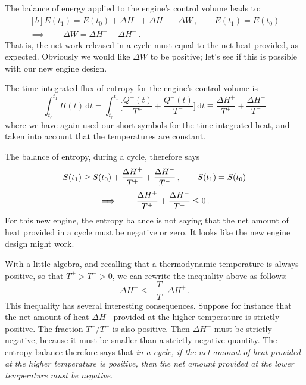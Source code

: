 \documentclass[a4paper,12pt,%
onecolumn,oneside,%
british%
]{memoir}
\newcommand*{\di}{\mathrm{d}}%
\newcommand*{\incr}{\Delta}%
\renewcommand*{\|}[1][]{\nonscript\:#1\vert\nonscript\:\mathopen{}}
\newcommand*{\yti}{t_{0}}
\newcommand*{\ytf}{t_{1}}
\newcommand*{\dt}{\di t}
\newcommand*{\yE}{E}
\newcommand*{\yQ}{Q}%
\newcommand*{\yQp}{\yQ^{+}}%
\newcommand*{\yQm}{\yQ^{-}}%
\newcommand*{\yhep}{\incr H^{+}}%
\newcommand*{\yhem}{\incr H^{-}}%
\newcommand*{\yW}{\incr W}%
\newcommand*{\yS}{S}
\newcommand*{\yB}{\varPi}
\newcommand*{\yT}{T}%
\newcommand*{\yTp}{\yT^{+}}%
\newcommand*{\yTm}{\yT^{-}}%
\begin{document}
The balance of energy applied to the engine's control volume leads to:
\begin{equation}\label{eq:engine2_heatwork}
  \begin{gathered}[b]
    \yE(\ytf) = \yE(\yti) + \yhep + \yhem - \yW \,,
    \qquad
    \yE(\ytf)=\yE(\yti)
    \\
    \implies\qquad
    \yW = \yhep + \yhem \,.
  \end{gathered}
\end{equation}
That is, the net work released in a cycle must equal to the net heat provided, as expected. Obviously we would like $\yW$ to be positive; let's see if this is possible with our new engine design.

\medskip

The time-integrated flux of entropy for the engine's control volume is
\begin{equation*}
    \int_{\yti}^{\ytf}\!\!\yB(t)\,\dt =
    \int_{\yti}^{\ytf}\!\biggl[\frac{\yQp(t)}{\yTp} +
    \frac{\yQm(t)}{\yTm}
    \biggr]\,\dt
\equiv \frac{\yhep}{\yTp} + \frac{\yhem}{\yTm}
\end{equation*}
where we have again used our short symbols for the time-integrated heat, and taken into account that the temperatures are constant.

The balance of entropy, during a cycle, therefore says
\begin{equation*}
  \begin{gathered}
    \yS(\ytf) \ge \yS(\yti) + \frac{\yhep}{\yTp} + \frac{\yhem}{\yTm}
    \,,
    \qquad
    \yS(\ytf)=\yS(\yti)
    \\[\jot]
    \implies\qquad
      \frac{\yhep}{\yTp} + \frac{\yhem}{\yTm}  \le 0 \,.
  \end{gathered}
\end{equation*}
For this new engine, the entropy balance is not saying that the net amount of heat provided in a cycle must be negative or zero. It looks like the new engine design might work.

\medskip

With a little algebra, and recalling that a thermodynamic temperature is always positive, so that $\yTp > \yTm > 0$, we can rewrite the inequality above as follows:
\begin{equation}\label{eq:engine2_heatminus}
  \yhem \le -\frac{\yTm}{\yTp}\yhep \,.
\end{equation}
This inequality has several interesting consequences. Suppose for instance that the net amount of heat $\yhep$ provided at the higher temperature is strictly positive.
The fraction $\yTm/\yTp$ is also positive. Then $\yhem$ must be strictly negative, because it must be smaller than a strictly negative quantity. The entropy balance therefore says that \emph{in a cycle, if the net amount of heat provided at the higher temperature is positive, then the net amount provided at the lower temperature must be negative}.
\end{document}
